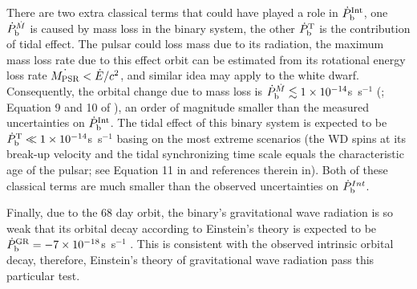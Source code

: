 There are two extra classical terms that could have played a role in
$\dot{P}_{\rm b}^{\rm Int}$, one $\dot{P}_{\rm b}^{\dot{M}}$ is caused by mass loss in the
binary system, the other $ \dot{P}_{\rm b}^{\rm T}$ is the contribution of tidal effect.
The pulsar could loss mass due to its radiation, the maximum mass loss rate
due to this effect orbit can be estimated from its rotational energy loss rate
$\dot{M_{\rm PSR}}<\dot{E}/c^2$, and similar idea may apply to the white
dwarf. 
Consequently, the orbital change due to mass loss is $\dot{P}_{\rm
b}^{\dot{M}}\lesssim 1\times10^{-14}$s~s$^{-1}$ (\citealt{dt91}; Equation 9 and 10
of \citealt{fwe+12}), an order of magnitude smaller than the measured
uncertainties on $\dot{P}_{\rm b}^{\rm Int}$.
The tidal effect of this binary system is expected to be $\dot{P}_{\rm b}^{\rm
T}\ll1\times10^{-14}$s~s$^{-1}$ basing on the most extreme scenarios (the WD spins at
its break-up velocity and the tidal synchronizing time scale equals the
characteristic age of the pulsar; see Equation 11 in \citealt{fwe+12} and
references therein in).
Both of these classical terms are much smaller than the observed uncertainties
on $\dot{P}_{\rm b}^{Int}$.


Finally, due to the 68 day orbit, the binary's  gravitational wave
radiation is so weak that its orbital decay according to Einstein's
theory is expected to be 
$\dot{P}_{\rm b}^{\rm GR} = -7\times10^{-18}$s~s$^{-1}$ \citep{lk05}.
This is consistent with the observed intrinsic orbital decay, therefore,
Einstein's theory of gravitational wave radiation pass this particular test.



